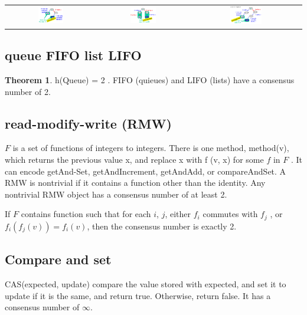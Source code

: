 \documentclass{article}
\theoremstyle{definition}
\newtheorem{theorem}{Theorem}
\begin{document}
\begin{center}
\begin{tabular}{c c c}
\includegraphics[width=0.3\textwidth]{regnumb_1} &
\includegraphics[width=0.3\textwidth]{regnumb_2} &
\includegraphics[width=0.3\textwidth]{regnumb_3} 
\end{tabular}
\end{center}

\subsection{queue FIFO list LIFO}
\begin{theorem}
h(Queue) = 2 . FIFO (quieues) and LIFO (lists) have a consensus number of 2.
\end{theorem}

\subsection{read-modify-write (RMW)}

$F$ is a set of functions of integers to integers. There is one method, method(v), which returns the previous value x, and replace x with f (v, x) for some $f$ in $F$ . It can encode getAnd-Set, getAndIncrement, getAndAdd, or compareAndSet. A RMW is nontrivial if it contains a function other than the identity. Any nontrivial RMW object has a consensus number of at least 2.

If $F$ contains function such that for each $i$, $j$, either $f_i$ commutes with $f_j$ , or $f_i(f_j(v)) = f_i(v)$, then the consensus number is exactly 2.


\subsection{Compare and set}
CAS(expected, update) compare the value stored with expected, and set it to update if it is the same, and return true. Otherwise, return false. It has a consensus number of $\infty$.
\end{document}
